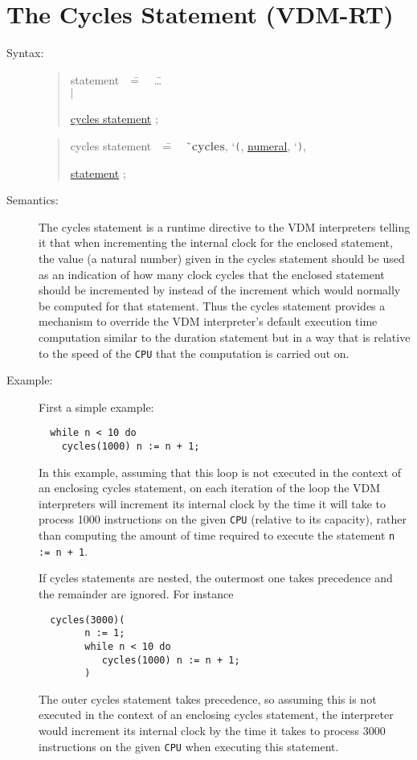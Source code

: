 \documentclass{overturerepchap}
\newcommand{\Lit}[1]{`{\tt #1}\Quote}
\newcommand{\Rule}[2]{
  \begin{quote}\begin{tabbing}
    #1\index{#1}\ \ \= = \ \ \= #2  ; %
    
  \end{tabbing}\end{quote}
  }
\newcommand{\Ruleref}[1]{
  \hyperlink{rule:#1}{#1}}
\newcommand{\dsep}{\\ \> $|$ \>}
\newcommand{\Lop}[1]{`{\bf\ttfamily #1}\Quote}
\begin{document}
\section{The Cycles Statement (VDM-RT)}

\begin{description}
\item[Syntax:]
  \Rule{statement}{
    \ldots \dsep
    \Ruleref{cycles statement}
  }
  \Rule{cycles statement}{
    \Lop{cycles}, \Lit{(}, \Ruleref{numeral}, \Lit{)},
    \Ruleref{statement}
  }

\item[Semantics:]
The cycles statement is a runtime directive to the VDM interpreters
telling it that when incrementing the internal clock for the enclosed
statement, the value (a natural number)
given in the cycles statement should be used as
an indication of how many clock cycles that the enclosed statement
should be incremented by instead of the increment which would normally
be computed for that statement. Thus the cycles statement provides a
mechanism to override the VDM interpreter's default execution time
computation similar to the duration statement but in a way that is
relative to the speed of the \texttt{CPU} that the computation is carried
out on.

\item[Example:] First a simple example:
\begin{lstlisting}
  while n < 10 do
    cycles(1000) n := n + 1; 
\end{lstlisting}
In this example, assuming that this loop is not executed in the
context of an enclosing cycles statement, on each iteration of the
loop the VDM interpreters will increment its internal clock by the time it will
take to process 1000 instructions on the given \texttt{CPU} (relative
to its capacity), rather than computing the amount of time required to
execute the statement \texttt{n := n + 1}. 

If cycles statements are nested, the outermost one takes precedence
and the remainder are ignored. For instance
\begin{lstlisting}
  cycles(3000)(
        n := 1;
        while n < 10 do
           cycles(1000) n := n + 1; 
        )
\end{lstlisting}
The outer cycles statement takes precedence, so assuming this is not
executed in the context of an enclosing cycles statement, the
interpreter would increment its internal clock by the time it takes to
process 3000 instructions on the given \texttt{CPU} when
executing this statement.


\end{description}
\end{document}
